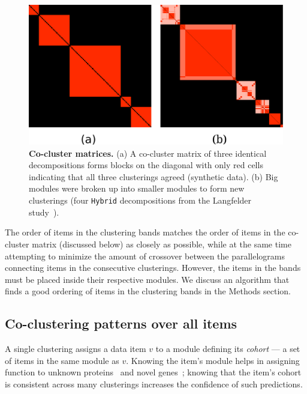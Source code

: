 \documentclass[12pt]{cmuthesis}
\begin{document}
  \begin{figure}[ht]
    \centering
    \includegraphics[width=0.7\linewidth]{figures/coral_matrices}
    \caption{\textbf{Co-cluster matrices.} (a) A co-cluster matrix of three identical decompositions forms blocks on
    the diagonal with only red cells indicating that all three clusterings agreed
    (synthetic data). (b) Big modules were broken up into smaller modules to form
    new clusterings (four \texttt{Hybrid} decompositions from the Langfelder
    study~\cite{Langfelder2008}).}
    \label{fig:coral:matrices}
  \end{figure}

  The order of items in the clustering bands matches the order of items in the
  co-cluster matrix (discussed below) as closely as possible, while at the same
  time attempting to minimize the amount of crossover between the parallelograms
  connecting items in the consecutive clusterings. However, the items in the bands
  must be placed inside their respective modules. We
  discuss an algorithm that finds a good ordering of items in the
  clustering bands in the Methods section.


  \newcommand{\Mplus}{$A^{+}$~}

  \subsection{Co-clustering patterns over all items}

  A single clustering assigns a data item $v$ to a module defining its \textit{cohort} --- a set of items in the same module as $v$. Knowing the item's module helps in assigning function to unknown proteins~\cite{Bader2003} and novel genes~\cite{Ulitsky2010}; knowing that the item's cohort is consistent across many clusterings increases the confidence of such predictions.
\end{document}
